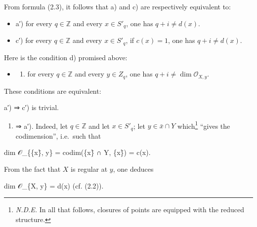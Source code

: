 \documentclass[
  11pt,
  a4paper,
]{book}
\newenvironment{Shaded}{}{}
\newcommand{\NormalTok}[1]{#1}
\providecommand{\tightlist}{%
  \setlength{\itemsep}{0pt}\setlength{\parskip}{0pt}}
\begin{document}
From formula (2.3), it follows that a) and c) are respectively
equivalent to:

\begin{itemize}
\tightlist
\item
  a′) for every \(q \in \mathbb{Z}\) and every \(x \in S'_{q}\), one has
  \(q + i \neq d(x)\).
\item
  c′) for every \(q \in \mathbb{Z}\) and every \(x \in S'_{q}\), if
  \(c(x) = 1\), one has \(q + i \neq d(x)\).
\end{itemize}

Here is the condition d) promised above:

\begin{itemize}
\tightlist
\item
  \begin{enumerate}
  \def\labelenumi{\alph{enumi})}
  \setcounter{enumi}{3}
  \tightlist
  \item
    for every \(q \in \mathbb{Z}\) and every \(y \in Z_{q}\), one has
    \(q + i \neq \dim \mathcal{O}_{X,y}\).
  \end{enumerate}
\end{itemize}

These conditions are equivalent:

a′) ⇒ c′) is trivial.

\begin{enumerate}
\def\labelenumi{\alph{enumi})}
\setcounter{enumi}{3}
\tightlist
\item
  ⇒ a′). Indeed, let \(q \in \mathbb{Z}\) and let \(x \in S'_{q}\); let
  \(y \in \bar{x} \cap Y\) which\footnote{\emph{N.D.E.} In all that
    follows, closures of points are equipped with the reduced structure.}
  ``gives the codimension'', i.e.~such that
\end{enumerate}

\begin{Shaded}
\begin{Highlighting}[]
\NormalTok{dim 𝒪\_\{\{x\}̄, y\} = codim(\{x\}̄ ∩ Y, \{x\}̄) = c(x).}
\end{Highlighting}
\end{Shaded}

From the fact that \(X\) is regular at \(y\), one deduces

\begin{Shaded}
\begin{Highlighting}[]
\NormalTok{dim 𝒪\_\{X, y\} = d(x)    (cf. (2.2)).}
\end{Highlighting}
\end{Shaded}
\end{document}
